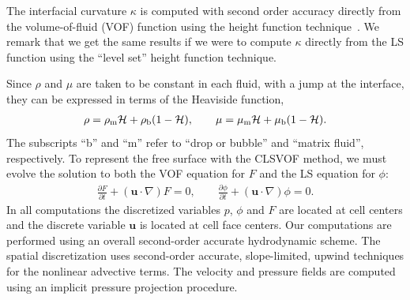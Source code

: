 \documentclass[review]{elsarticle}
\newcommand{\Hea}{\mathcal{H}}
\newcommand{\vv}{\mathbf}
\newcommand{\bmu}{\vv{u}}
\begin{document}
The interfacial curvature $\kappa$ is
computed with second order accuracy directly from the volume-of-fluid (VOF)
function using the height function technique~\cite{Sus03,SUSSMAN2007469}.  
We remark that we get the same
results if we were to compute $\kappa$ directly from the LS function using the
``level set'' height function technique.

Since $\rho$ and $\mu$ are taken to be constant in each fluid, with a jump at
the interface, they can be expressed in terms of the Heaviside function,
%
\begin{eqnarray}\label{rhomu}
  \rho=\rho_{\rm m}\Hea+\rho_{\rm b}(1-\Hea), \qquad 
  \mu=\mu_{\rm m}\Hea+\mu_{\rm b}(1-\Hea).
\end{eqnarray}
%
The subscripts ``b'' and ``m'' refer to ``drop or bubble'' and ``matrix
fluid'', respectively. To represent the free surface with the CLSVOF method, we
must evolve the solution to both the VOF equation for $F$ and the LS equation
for $\phi$:
%
\begin{align}\label{eq:clsvof}
  \frac{\partial F}{\partial t}+(\bmu\cdot\nabla)F = 0, \qquad 
  \frac{\partial \phi}{\partial t}+(\bmu\cdot\nabla)\phi = 0. 
\end{align}
%
In all computations the discretized variables $p$, $\phi$ and $F$ are located at
cell centers and the discrete variable $\bmu$ is located at cell face centers.
Our computations are performed using an overall second-order accurate
hydrodynamic scheme.  The spatial discretization uses second-order accurate,
slope-limited, upwind techniques for the nonlinear advective terms.  The
velocity and pressure fields are computed using an implicit pressure projection
procedure. 
\end{document}
